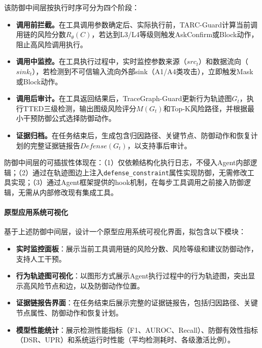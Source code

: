 
该防御中间层按执行时序可分为四个阶段：

\begin{itemize}[leftmargin=2em,itemsep=0pt]
  \item \textbf{调用前拦截。}在工具调用参数确定后、实际执行前，TARC-Guard计算当前调用链的风险分数$R_\theta(C)$，若达到L3/L4等级则触发AskConfirm或Block动作，阻止高风险调用执行。

  \item \textbf{调用中监控。}在工具执行过程中，实时监控参数来源（$src_t$）和数据流向（$sink_t$），若检测到不可信输入流向外部sink（A1/A4类攻击），立即触发Mask或Block动作。

  \item \textbf{调用后审计。}在工具返回结果后，TraceGraph-Guard更新行为轨迹图$G_t$，执行TTED三级检测，输出图级风险评分$M(G_t)$和Top-K风险路径，并根据最小干预防御公式选择防御动作。

  \item \textbf{证据归档。}在任务结束后，生成包含归因路径、关键节点、防御动作和恢复计划的完整证据链报告$Defense(G_t)$，以支持事后审计。
\end{itemize}


防御中间层的可插拔性体现在：（1）仅依赖结构化执行日志，不侵入Agent内部逻辑；（2）通过在轨迹图边上注入\texttt{defense\_constraint}属性实现防御，无需修改工具实现；（3）通过Agent框架提供的hook机制，在每步工具调用之前接入防御逻辑，无需从内部修改现有集成工具。

\paragraph{原型应用系统可视化}
基于上述防御中间层，设计一个原型应用系统可视化界面，拟包含以下模块：
\begin{itemize}[leftmargin=2em,itemsep=0pt]
  \item \textbf{实时监控面板}：展示当前工具调用链的风险分数、风险等级和建议防御动作，支持人工干预。
  \item \textbf{行为轨迹图可视化}：以图形方式展示Agent执行过程中的行为轨迹图，突出显示高风险节点和边，以及防御动作位置。
  \item \textbf{证据链报告界面}：在任务结束后展示完整的证据链报告，包括归因路径、关键节点属性、防御动作和恢复计划。
  \item \textbf{模型性能统计}：展示检测性能指标（F1、AUROC、Recall）、防御有效性指标（DSR、UPR）和系统运行时性能（平均检测耗时、各级激活比例）。
\end{itemize}

